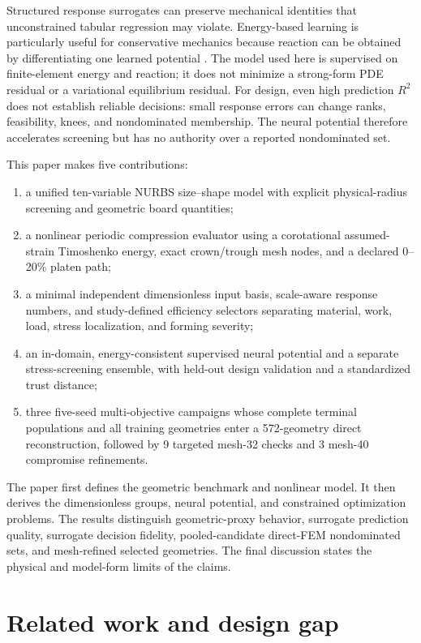 \documentclass[11pt]{article}
\begin{document}
Structured response surrogates can preserve mechanical identities that unconstrained tabular regression may violate. Energy-based learning is particularly useful for conservative mechanics because reaction can be obtained by differentiating one learned potential \citep{Samaniego2020,NguyenThanh2020,Rezaei2022}. The model used here is supervised on finite-element energy and reaction; it does not minimize a strong-form PDE residual or a variational equilibrium residual. For design, even high prediction $R^2$ does not establish reliable decisions: small response errors can change ranks, feasibility, knees, and nondominated membership. The neural potential therefore accelerates screening but has no authority over a reported nondominated set.

This paper makes five contributions:
\begin{enumerate}[leftmargin=*,itemsep=2pt]
\item a unified ten-variable NURBS size--shape model with explicit physical-radius screening and geometric board quantities;
\item a nonlinear periodic compression evaluator using a corotational assumed-strain Timoshenko energy, exact crown/trough mesh nodes, and a declared 0--20\% platen path;
\item a minimal independent dimensionless input basis, scale-aware response numbers, and study-defined efficiency selectors separating material, work, load, stress localization, and forming severity;
\item an in-domain, energy-consistent supervised neural potential and a separate stress-screening ensemble, with held-out design validation and a standardized trust distance;
\item three five-seed multi-objective campaigns whose complete terminal populations and all training geometries enter a 572-geometry direct reconstruction, followed by 9 targeted mesh-32 checks and 3 mesh-40 compromise refinements.
\end{enumerate}

The paper first defines the geometric benchmark and nonlinear model. It then derives the dimensionless groups, neural potential, and constrained optimization problems. The results distinguish geometric-proxy behavior, surrogate prediction quality, surrogate decision fidelity, pooled-candidate direct-FEM nondominated sets, and mesh-refined selected geometries. The final discussion states the physical and model-form limits of the claims.

\section{Related work and design gap}
\end{document}
